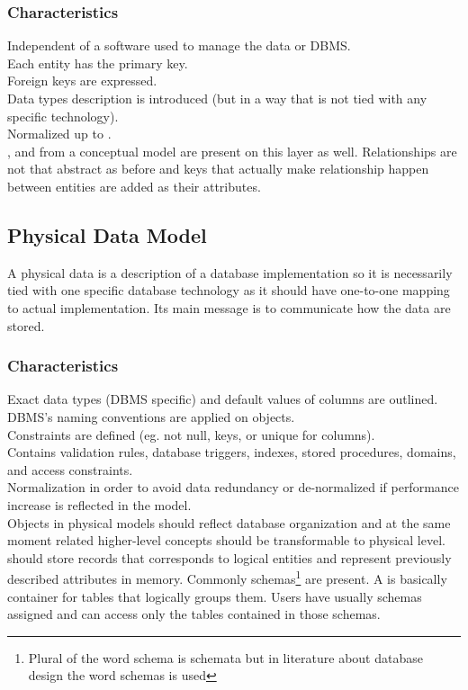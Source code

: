 \subsubsection{Characteristics}
Independent of a software used to manage the data or DBMS. \\
Each entity has the primary key. \\
Foreign keys are expressed. \\
Data types description is introduced (but in a way that is not tied with any specific technology). \\
Normalized up to . \\

,  and  from a conceptual model are present on this layer as well. Relationships are not that abstract as before and keys that actually make relationship happen between entities are added as their attributes.

\subsection{Physical Data Model}

A physical data is a description of a database implementation so it is necessarily tied with one specific database technology as it should have one-to-one mapping to actual implementation. Its main message is to communicate how the data are stored.

\subsubsection{Characteristics}

Exact data types (DBMS specific) and default values of columns are outlined. \\
DBMS's naming conventions are applied on objects. \\
Constraints are defined (eg. not null, keys, or unique for columns). \\
Contains validation rules, database triggers, indexes, stored procedures, domains, and access constraints. \\ 
Normalization in order to avoid data redundancy or de-normalized if performance increase is reflected in the model. \\

Objects in physical models should reflect database organization and at the same moment related higher-level concepts should be transformable to physical level.  should store records that corresponds to logical entities and  represent previously described attributes in memory.
Commonly schemas\footnote{Plural of the word schema is schemata but in literature about database design the word schemas is used} are present. A  is basically container for tables that logically groups them. Users have usually schemas assigned and can access only the tables contained in those schemas.

